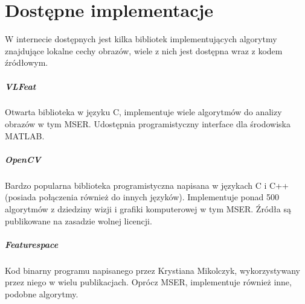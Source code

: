 
\section{Dostępne implementacje}

W internecie dostępnych jest kilka bibliotek implementujących algorytmy
znajdujące lokalne cechy obrazów, wiele z nich jest dostępna wraz z kodem
źródłowym.

\subparagraph{VLFeat \cite{vlfeat}}

Otwarta biblioteka w języku C, implementuje wiele algorytmów do analizy obrazów
w tym MSER. Udostępnia programistyczny interface dla środowiska MATLAB.

\subparagraph{OpenCV \cite{opencv}}

Bardzo popularna biblioteka programistyczna napisana w językach C i C++
(posiada połączenia również do innych języków). Implementuje ponad 500
algorytmów z dziedziny wizji i grafiki komputerowej w tym MSER. Źródła są
publikowane na zasadzie wolnej licencji.

\subparagraph{Featurespace \cite{featurespace}}

Kod binarny programu napisanego przez Krystiana Mikolczyk, wykorzystywany przez
niego w wielu publikacjach. Oprócz MSER, implementuje również inne, podobne
algorytmy.
